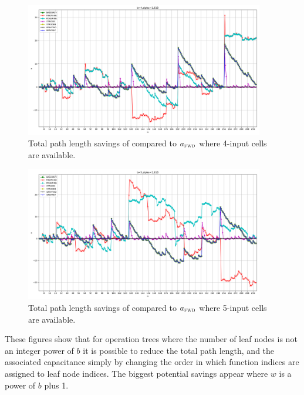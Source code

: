 \documentclass[11pt,twoside]{article}
\begin{document}
\begin{figure}[h]
    \centering
    \includegraphics[width=0.93\textwidth]{b=4,alpha=1_618.png}
    \caption{Total path length savings of compared to $a_{\textsc{fwd}}$ where
             4-input cells are available.
             \label{fig:b=4,alpha=1_618}}
\end{figure}
\vfill
\begin{figure}[h]
    \centering
    \includegraphics[width=0.93\textwidth]{b=5,alpha=1_618.png}
    \caption{Total path length savings of compared to $a_{\textsc{fwd}}$ where
             5-input cells are available.
             \label{fig:b=5,alpha=1_618}}
\end{figure}
\clearpage
These figures show that for operation trees where the number of leaf nodes is
not an integer power of $b$ it is possible to reduce the total path length, and
the associated capacitance simply by changing the order in which function
indices are assigned to leaf node indices.
The biggest potential savings appear where $w$ is a power of $b$ plus 1.

\end{document}
